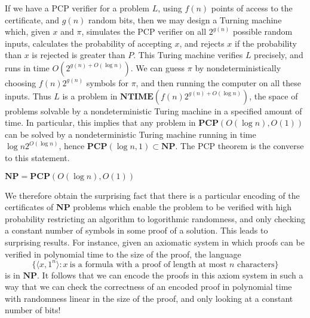 If we have a PCP verifier for a problem $L$, using $f(n)$ points of access to the certificate, and $g(n)$ random bits, then we may design a Turning machine which, given $x$ and $\pi$, simulates the PCP verifier on all $2^{g(n)}$ possible random inputs, calculates the probability of accepting $x$, and rejects $x$ if the probability than $x$ is rejected is greater than $P$. This Turing machine verifies $L$ precisely, and runs in time $O(2^{g(n) + O(\log n)})$. We can guess $\pi$ by nondeterministically choosing $f(n)2^{g(n)}$ symbols for $\pi$, and then running the computer on all these inputs. Thus $L$ is a problem in $\mathbf{NTIME}(f(n)2^{g(n) + O(\log n)})$, the space of problems solvable by a nondeterministic Turing machine in a specified amount of time. In particular, this implies that any problem in $\mathbf{PCP}(O(\log n), O(1))$ can be solved by a nondeterministic Turing machine running in time $\log n 2^{O(\log n)}$, hence $\mathbf{PCP}(\log n, 1) \subset \mathbf{NP}$. The PCP theorem is the converse to this statement.

\begin{theorem}
    $\mathbf{NP} = \mathbf{PCP}(O(\log n), O(1))$
\end{theorem}

We therefore obtain the surprising fact that there is a particular encoding of the certificates of $\mathbf{NP}$ problems which enable the problem to be verified with high probability restricting an algorithm to logorithmic randomness, and only checking a constant number of symbols in some proof of a solution. This leads to surprising results. For instance, given an axiomatic system in which proofs can be verified in polynomial time to the size of the proof, the language
%
\[ \{ \langle x, 1^n \rangle : x\ \text{is a formula with a proof of length at most $n$ characters} \} \]
%
is in $\mathbf{NP}$. It follows that we can encode the proofs in this axiom system in such a way that we can check the correctness of an encoded proof in polynomial time with randomness linear in the size of the proof, and only looking at a constant number of bits!

